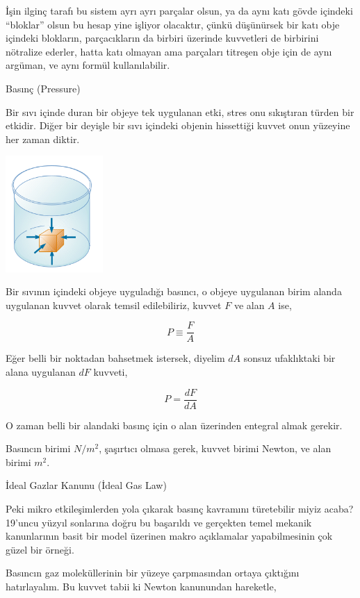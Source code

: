 \documentclass[12pt,fleqn]{article}\usepackage{../../common}
\begin{document}
İşin ilginç tarafı bu sistem ayrı ayrı parçalar olsun, ya da aynı katı gövde
içindeki ``bloklar'' olsun bu hesap yine işliyor olacaktır, çünkü düşünürsek bir
katı obje içindeki blokların, parçacıkların da birbiri üzerinde kuvvetleri de
birbirini nötralize ederler, hatta katı olmayan ama parçaları titreşen obje için
de aynı argüman, ve aynı formül kullanılabilir.





Basınç (Pressure)

Bir sıvı içinde duran bir objeye tek uygulanan etki, stres onu
sıkıştıran türden bir etkidir. Diğer bir deyişle bir sıvı içindeki
objenin hissettiği kuvvet onun yüzeyine her zaman diktir.

\includegraphics[width=10em]{phy_005_basics_07.png}

Bir sıvının içindeki objeye uyguladığı basıncı, o objeye uygulanan
birim alanda uygulanan kuvvet olarak temsil edilebiliriz, kuvvet $F$
ve alan $A$ ise,

$$
P \equiv \frac{F}{A}
$$

Eğer belli bir noktadan bahsetmek istersek, diyelim $dA$ sonsuz
ufaklıktaki bir alana uygulanan $dF$ kuvveti,

$$
P = \frac{dF}{dA}
$$

O zaman belli bir alandaki basınç için o alan üzerinden entegral almak gerekir. 

Basıncın birimi $N / m^2$, şaşırtıcı olmasa gerek, kuvvet birimi
Newton, ve alan birimi $m^2$.

İdeal Gazlar Kanunu (İdeal Gas Law)

Peki mikro etkileşimlerden yola çıkarak basınç kavramını türetebilir miyiz
acaba? 19'uncu yüzyıl sonlarına doğru bu başarıldı ve gerçekten temel mekanik
kanunlarının basit bir model üzerinen makro açıklamalar yapabilmesinin çok güzel
bir örneği.

Basıncın gaz moleküllerinin bir yüzeye çarpmasından ortaya çıktığını
hatırlayalım. Bu kuvvet tabii ki Newton kanunundan hareketle,
\end{document}
